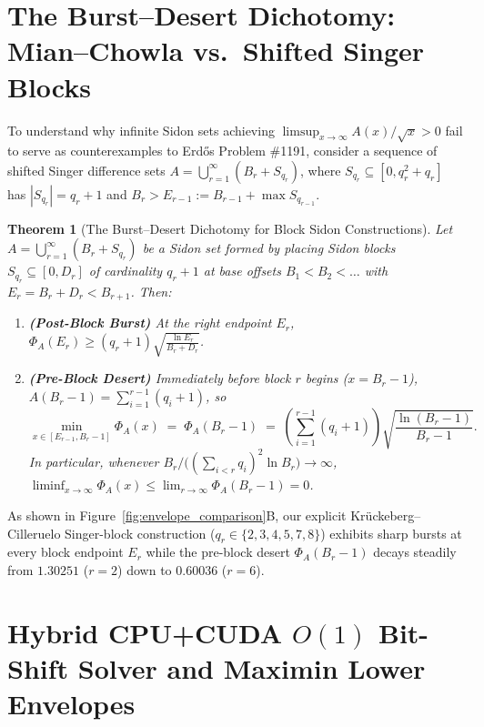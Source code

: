 \documentclass[11pt,reqno]{amsart}
\newtheorem{theorem}{Theorem}[section]
\theoremstyle{definition}
\theoremstyle{remark}
\begin{document}
\section{The Burst--Desert Dichotomy: Mian--Chowla vs.\ Shifted Singer Blocks}

To understand why infinite Sidon sets achieving $\limsup_{x\to\infty} A(x)/\sqrt{x} > 0$ fail to serve as counterexamples to Erd\H{o}s Problem \#1191, consider a sequence of shifted Singer difference sets $A = \bigcup_{r=1}^\infty (B_r + S_{q_r})$, where $S_{q_r} \subseteq [0, q_r^2 + q_r]$ has $|S_{q_r}| = q_r + 1$ and $B_r > E_{r-1} := B_{r-1} + \max S_{q_{r-1}}$.

\begin{theorem}[The Burst--Desert Dichotomy for Block Sidon Constructions]\label{thm:burst_desert}
Let $A = \bigcup_{r=1}^\infty (B_r + S_{q_r})$ be a Sidon set formed by placing Sidon blocks $S_{q_r} \subseteq [0, D_r]$ of cardinality $q_r + 1$ at base offsets $B_1 < B_2 < \dots$ with $E_r = B_r + D_r < B_{r+1}$. Then:
\begin{enumerate}
  \item[\textup{(i)}] \textbf{(Post-Block Burst)} At the right endpoint $E_r$, $\Phi_A(E_r) \ge (q_r + 1)\sqrt{\frac{\ln E_r}{B_r + D_r}}$.
  \item[\textup{(ii)}] \textbf{(Pre-Block Desert)} Immediately before block $r$ begins ($x = B_r - 1$), $A(B_r - 1) = \sum_{i=1}^{r-1} (q_i + 1)$, so
  \begin{equation}\label{eq:desert_bound}
    \min_{x \in [E_{r-1}, B_r - 1]} \Phi_A(x) \;=\; \Phi_A(B_r - 1) \;=\; \left(\sum_{i=1}^{r-1} (q_i + 1)\right) \sqrt{\frac{\ln(B_r - 1)}{B_r - 1}}.
  \end{equation}
  In particular, whenever $B_r / \bigl((\sum_{i<r} q_i)^2 \ln B_r\bigr) \to \infty$, $\liminf_{x\to\infty} \Phi_A(x) \le \lim_{r\to\infty} \Phi_A(B_r - 1) = 0$.
\end{enumerate}
\end{theorem}

As shown in Figure~\ref{fig:envelope_comparison}B, our explicit Kr\"uckeberg--Cilleruelo Singer-block construction ($q_r \in \{2, 3, 4, 5, 7, 8\}$) exhibits sharp bursts at every block endpoint $E_r$ while the pre-block desert $\Phi_A(B_r - 1)$ decays steadily from $1.30251$ ($r = 2$) down to $0.60036$ ($r = 6$).

\section{Hybrid CPU+CUDA $O(1)$ Bit-Shift Solver and Maximin Lower Envelopes}
\end{document}
